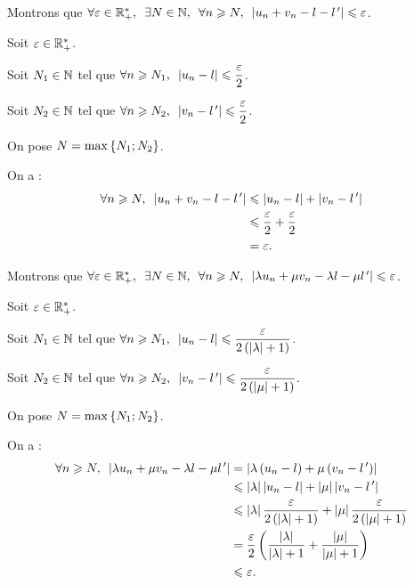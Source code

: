 \begin{dem}[1]
Montrons que \(\quantifs{\forall\epsilon\in\Rps;\exists N\in\N;\forall n\geq N}\abs{u_n+v_n-l-l\prim}\leq\epsilon\).

Soit \(\varepsilon\in\mathbb{R}_+^*\).

Soit \(N_1\in\mathbb{N}\) tel que \(\quantifs{\forall n\geq N_1}\abs{u_n-l}\leq\dfrac{\epsilon}{2}\).

Soit \(N_2\in\mathbb{N}\) tel que \(\quantifs{\forall n\geq N_2}\abs{v_n-l\prim}\leq\dfrac{\epsilon}{2}\).

On pose \(N=\max\left\lbrace N_1;N_2\right\rbrace\).

On a : \[\begin{aligned}
\quantifs{\forall n\geq N}\abs{u_n+v_n-l-l\prim}&\leq\abs{u_n-l}+\abs{v_n-l\prim} \\
&\leq\dfrac{\epsilon}{2}+\dfrac{\epsilon}{2} \\
&=\epsilon.
\end{aligned}\]
\end{dem}

\begin{dem}[2]
Montrons que \(\quantifs{\forall\epsilon\in\Rps;\exists N\in\N;\forall n\geq N}\abs{\lambda u_n+\mu v_n-\lambda l-\mu l\prim}\leq\epsilon\).

Soit \(\varepsilon\in\mathbb{R}_+^*\).

Soit \(N_1\in\mathbb{N}\) tel que \(\quantifs{\forall n\geq N_1}\abs{u_n-l}\leq\dfrac{\epsilon}{2\paren{\abs{\lambda}+1}}\).

Soit \(N_2\in\mathbb{N}\) tel que \(\quantifs{\forall n\geq N_2}\abs{v_n-l\prim}\leq\dfrac{\epsilon}{2\paren{\abs{\mu}+1}}\).

On pose \(N=\max\left\lbrace N_1;N_2\right\rbrace\).

On a : \[\begin{aligned}
\quantifs{\forall n\geq N}\abs{\lambda u_n+\mu v_n-\lambda l-\mu l\prim}&=\abs{\lambda\paren{u_n-l}+\mu\paren{v_n-l\prim}} \\
&\leq\abs{\lambda}\abs{u_n-l}+\abs{\mu}\abs{v_n-l\prim} \\
&\leq\abs{\lambda}\dfrac{\epsilon}{2\paren{\abs{\lambda}+1}}+\abs{\mu}\dfrac{\epsilon}{2\paren{\abs{\mu}+1}} \\
&=\dfrac{\epsilon}{2}\paren{\dfrac{\abs{\lambda}}{\abs{\lambda}+1}+\dfrac{\abs{\mu}}{\abs{\mu}+1}} \\
&\leq\epsilon.
\end{aligned}\]
\end{dem}

